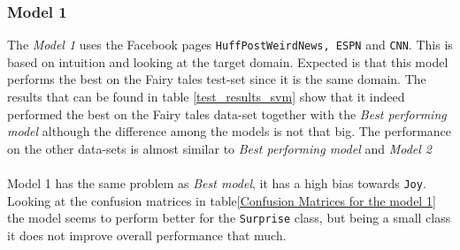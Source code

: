 \documentclass[11pt]{article}
\begin{document}
\subsubsection{Model 1}
The \textit{Model 1} uses the Facebook pages \texttt{HuffPostWeirdNews, ESPN} and \texttt{CNN}. This is based on intuition and looking at the target domain. Expected is that this model performs the best on the Fairy tales test-set since it is the same domain. The results that can be found in table \ref{test_results_svm} show that it indeed performed the best on the Fairy tales data-set together with the \textit{Best performing model} although the difference among the models is not that big. The performance on the other data-sets is almost similar to  \textit{Best performing model} and \textit{Model 2}\\\\
Model 1 has the same problem as \textit{Best model}, it has a high bias towards \texttt{Joy}. Looking at the confusion matrices in table\ref{Confusion Matrices for the model 1} the model seems to perform better for the \texttt{Surprise} class, but being a small class it does not improve overall performance that much.
\end{document}
